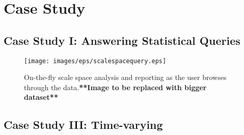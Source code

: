 \section{Case Study}
\label{sec:casestudy}
\subsection{Case Study I: Answering Statistical Queries}
\label{sec:casestudy_1}
\begin{figure}[!htb]
\centering
	\texttt{[image: images/eps/scalespacequery.eps]}
	\caption{On-the-fly scale space analysis and reporting as the user browses through the data.\textbf{**Image to be replaced with bigger dataset**}}	
	\label{fig:distestimationalgo}
\end{figure}


\subsection{Case Study III: Time-varying}
\label{sec:casestudy_3}

